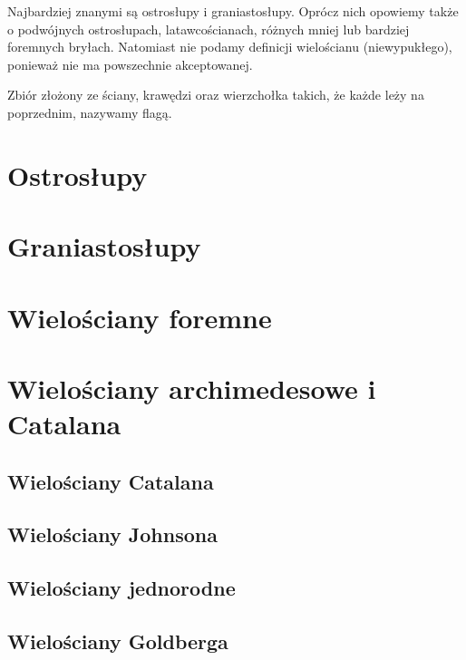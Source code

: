 Najbardziej znanymi są ostrosłupy i graniastosłupy.
Oprócz nich opowiemy także o podwójnych ostrosłupach, latawcościanach, różnych mniej lub bardziej foremnych bryłach.
Natomiast nie podamy definicji wielościanu (niewypukłego), ponieważ nie ma powszechnie akceptowanej.

\begin{definition}[flaga]
    Zbiór złożony ze ściany, krawędzi oraz wierzchołka takich, że każde leży na poprzednim, nazywamy flagą.
\end{definition} %


\section{Ostrosłupy}


\section{Graniastosłupy}


\section{Wielościany foremne}


\section{Wielościany archimedesowe i Catalana}


\subsection{Wielościany Catalana}


\subsection{Wielościany Johnsona}


\subsection{Wielościany jednorodne}



\subsection{Wielościany Goldberga}


